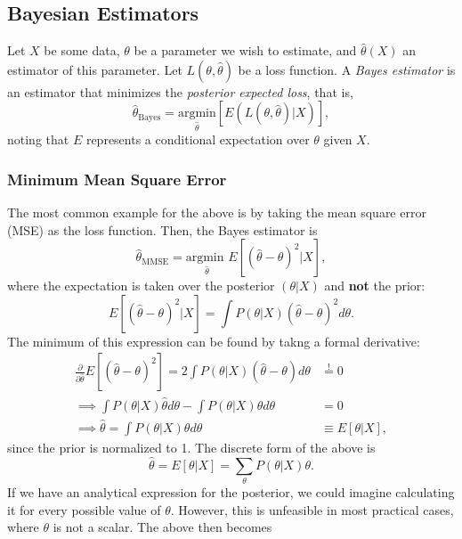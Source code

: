 \documentclass{article}
\begin{document}
\subsection{Bayesian Estimators}
Let $X$ be some data, $\theta$ be a parameter we wish to estimate, and $\hat{\theta}(X)$ an estimator of this parameter. Let $L(\theta,\hat{\theta})$ be a loss function. A \emph{Bayes estimator} is an estimator that minimizes the \emph{posterior expected loss}, that is,
\begin{equation}
    \hat{\theta}_{\text{Bayes}} = \underset{\hat{\theta}}{\text{argmin}}\left[
    E(L(\theta,\hat{\theta}) | X)\right],
\end{equation}
noting that $E$ represents a conditional expectation over $\theta$ given $X$.
\subsubsection*{Minimum Mean Square Error}
The most common example for the above is by taking the mean square error (MSE) as the loss function. Then, the Bayes estimator is
\begin{equation}
    \hat{\theta}_{\text{MMSE}} =
    \underset{\hat{\theta}}{\text{argmin }} E\left[(\hat{\theta} - \theta)^2 | X \right],
\end{equation}
where the expectation is taken over the posterior $(\theta | X)$ and \textbf{not} the prior:
\begin{equation}
    E\left[(\hat{\theta} - \theta)^2  | X\right]
    =
    \int P(\theta | X) (\hat{\theta} - \theta)^2 d\theta.
\end{equation}
The minimum of this expression can be found by takng a formal derivative:
\begin{align}
    \frac{\partial}{\partial \hat{\theta}}
    E\left[(\hat{\theta} - \theta)^2 \right]
    = 2\int P(\theta | X) (\hat{\theta} - \theta) d\theta
    &\overset{!}{=} 0 \\
    \implies
    \int  P(\theta | X) \hat{\theta} d\theta
    - \int  P(\theta | X) \theta d\theta &= 0 \\
    \implies
    \hat{\theta} = \int P(\theta | X)\theta d\theta
    &\equiv E\left[ \theta | X\right],
\end{align}
since the prior is normalized to 1. The discrete form of the above is
\begin{equation}
    \hat{\theta} = E\left[ \theta | X\right]
    =
    \sum_{\theta} P(\theta | X)\theta.
\end{equation}
If we have an analytical expression for the posterior, we could imagine calculating it for every possible value of $\theta$. However, this is unfeasible in most practical cases, where $\theta$ is not a scalar. The above then becomes
\end{document}

